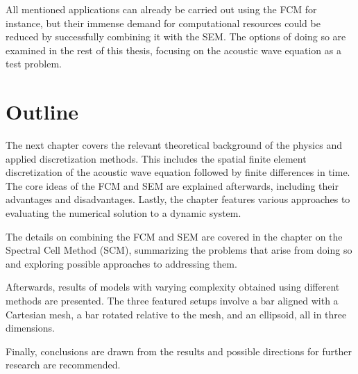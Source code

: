 All mentioned applications can already be carried out using the FCM for instance, but their immense demand for computational resources could be reduced by successfully combining it with the SEM. The options of doing so are examined in the rest of this thesis, focusing on the acoustic wave equation as a test problem.

%
\section{Outline}
\label{section:outline}
%

The next chapter covers the relevant theoretical background of the physics and applied discretization methods. This includes the spatial finite element discretization of the acoustic wave equation followed by finite differences in time.
The core ideas of the FCM and SEM are explained afterwards, including their advantages and disadvantages. Lastly, the chapter features various approaches to evaluating the numerical solution to a dynamic system.

The details on combining the FCM and SEM are covered in the chapter on the Spectral Cell Method (SCM), summarizing the problems that arise from doing so and exploring possible approaches to addressing them.

Afterwards, results of models with varying complexity obtained using different methods are presented. The three featured setups involve a bar aligned with a Cartesian mesh, a bar rotated relative to the mesh, and an ellipsoid, all in three dimensions.

Finally, conclusions are drawn from the results and possible directions for further research are recommended.